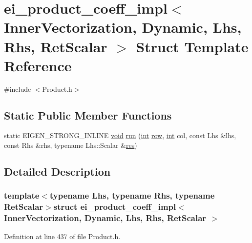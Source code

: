 \hypertarget{structei__product__coeff__impl_3_01_inner_vectorization_00_01_dynamic_00_01_lhs_00_01_rhs_00_01_ret_scalar_01_4}{\section{ei\-\_\-product\-\_\-coeff\-\_\-impl$<$ Inner\-Vectorization, Dynamic, Lhs, Rhs, Ret\-Scalar $>$ Struct Template Reference}
\label{structei__product__coeff__impl_3_01_inner_vectorization_00_01_dynamic_00_01_lhs_00_01_rhs_00_01_ret_scalar_01_4}
}


{\ttfamily \#include $<$Product.\-h$>$}

\subsection*{Static Public Member Functions}
\begin{DoxyCompactItemize}
\item 
static E\-I\-G\-E\-N\-\_\-\-S\-T\-R\-O\-N\-G\-\_\-\-I\-N\-L\-I\-N\-E \hyperlink{group___u_a_v_objects_plugin_ga444cf2ff3f0ecbe028adce838d373f5c}{void} \hyperlink{structei__product__coeff__impl_3_01_inner_vectorization_00_01_dynamic_00_01_lhs_00_01_rhs_00_01_ret_scalar_01_4_abe0e42125039db9f2feb1ff9883d145e}{run} (\hyperlink{ioapi_8h_a787fa3cf048117ba7123753c1e74fcd6}{int} \hyperlink{glext_8h_a11b277b422822f784ee248b43eee3e1e}{row}, \hyperlink{ioapi_8h_a787fa3cf048117ba7123753c1e74fcd6}{int} col, const Lhs \&lhs, const Rhs \&rhs, typename Lhs\-::\-Scalar \&\hyperlink{glext_8h_a1dbb21208b9047cc8031ca9c840d3c2f}{res})
\end{DoxyCompactItemize}


\subsection{Detailed Description}
\subsubsection*{template$<$typename Lhs, typename Rhs, typename Ret\-Scalar$>$struct ei\-\_\-product\-\_\-coeff\-\_\-impl$<$ Inner\-Vectorization, Dynamic, Lhs, Rhs, Ret\-Scalar $>$}



Definition at line 437 of file Product.\-h.




